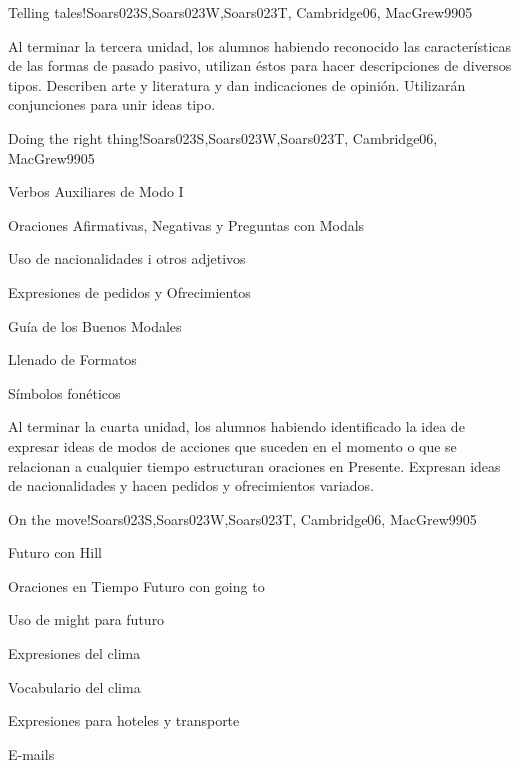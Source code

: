 \begin{syllabus}
\begin{unit}{Telling tales!}{Soars023S,Soars023W,Soars023T, Cambridge06, MacGrew99}{0}{5}
   \begin{learningoutcomes}
      \item Al terminar la tercera unidad, los alumnos habiendo reconocido las 
            características  de las formas de pasado pasivo, utilizan éstos para 
            hacer descripciones de diversos tipos. Describen arte y literatura y 
            dan indicaciones de opinión. Utilizarán conjunciones para unir ideas tipo. 
   \end{learningoutcomes}
\end{unit}

\begin{unit}{Doing the right thing!}{Soars023S,Soars023W,Soars023T, Cambridge06, MacGrew99}{0}{5}
   \begin{topics}
      \item Verbos Auxiliares de Modo I
      \item Oraciones Afirmativas, Negativas y Preguntas con Modals
      \item Uso de nacionalidades i otros adjetivos
      \item Expresiones de pedidos y Ofrecimientos
      \item Guía de los Buenos Modales
      \item Llenado de Formatos
      \item Símbolos fonéticos
   \end{topics}

   \begin{learningoutcomes}
      \item Al terminar la cuarta unidad, los alumnos habiendo identificado la idea de expresar ideas de modos de acciones que suceden en el momento o que se relacionan a cualquier tiempo estructuran oraciones en Presente. Expresan ideas de nacionalidades y hacen pedidos y ofrecimientos variados.
   \end{learningoutcomes}

\end{unit}

\begin{unit}{On the move!}{Soars023S,Soars023W,Soars023T, Cambridge06, MacGrew99}{0}{5}
   \begin{topics}
      \item Futuro con Hill
      \item Oraciones en Tiempo Futuro con going to
      \item Uso de might para futuro
      \item Expresiones del clima
      \item Vocabulario del clima
      \item Expresiones para hoteles y transporte
      \item E-mails
   \end{topics}


\end{unit}
\end{syllabus}
